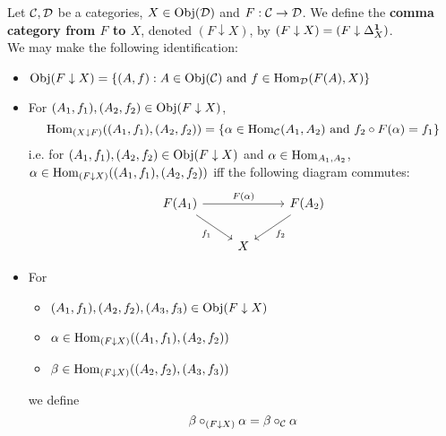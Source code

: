 \documentclass{book}
\begin{document}
	\begin{defn}
		Let $\mathcal{C}, \mathcal{D}$ be a categories, $X \in \operatorname{Obj}(\mathcal{D})$ and $F: \mathcal{C} \rightarrow \mathcal{D}$. We define the \textbf{comma category from $F$ to $X$}, denoted $(F \downarrow X)$, by $(F \downarrow X) = (F \downarrow \Delta^{\operatorname*{\mathbf{1}}}_X)$.\\
		We may make the following identification:
		\begin{itemize}
			\item $\operatorname{Obj}(F \downarrow X) = \{(A, f): A \in \operatorname{Obj}(\mathcal{C}) \text{ and } f \in \operatorname{Hom}_{\mathcal{D}}(F(A), X)\}$ 
			\item For $(A_1, f_1), (A_2, f_2) \in \operatorname{Obj}(F \downarrow X)$, 
			$$\operatorname{Hom}_{(X \downarrow F)}((A_1, f_1), (A_2, f_2)) = \{\alpha \in \operatorname{Hom}_{\mathcal{C}}(A_1, A_2) \text{ and } f_2 \circ F(\alpha)  = f_1\}$$
			i.e. for $(A_1, f_1), (A_2, f_2) \in \operatorname{Obj}(F \downarrow X)$ and $\alpha \in \operatorname{Hom}_{A_1, A_2}$, $\alpha \in \operatorname{Hom}_{(F \downarrow X)}((A_1, f_1), (A_2, f_2))$ iff the following diagram commutes:
			\[ 
			\begin{tikzcd}
				F(A_1) \arrow[dr, "f_1"'] \arrow[rr, "F(\al)"] &&  F(A_2) \arrow[dl, "f_2"]\\
				& X  & 
			\end{tikzcd}
			\]
			\item For 
			\begin{itemize}
				\item $(A_1, f_1), (A_2, f_2), (A_3, f_3) \in \operatorname{Obj}(F \downarrow X)$
				\item $\alpha \in \operatorname{Hom}_{(F \downarrow X)}((A_1, f_1), (A_2, f_2))$
				\item $\beta \in \operatorname{Hom}_{(F \downarrow X)}((A_2, f_2), (A_3, f_3))$
			\end{itemize}
			we define 
			$$\beta \circ_{(F \downarrow X)} \alpha = \beta \circ_{\mathcal{C}} \alpha $$
		\end{itemize}
	\end{defn}
	
	
	
	
	
	
	
	
	
	
	
	
	
	
	
	
	
	
	
	
	
	
	
	
	
	
	
	
	
	
	
\end{document}
